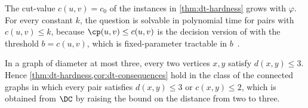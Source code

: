 \begin{remark}
\label{rem:dt-bounded-cut-value}
The cut-value $c(u, v) = c_0$ of the instances in \cref{thm:dt-hardness} grows with $\varphi$.
For every constant $k$, the question is solvable in polynomial time for pairs with $c(u, v) \leq k$, because $\cp(u, v) \leq c(u, v)$ is the decision version of \MinCutPath{} with the threshold $b = c(u, v)$, which is fixed-parameter tractable in $b$~\cite[Theorem~8.4]{Michel2026MinCutPath}.
\end{remark}

\begin{remark}
\label{rem:dt-shifted-class}
In a graph of diameter at most three, every two vertices $x, y$ satisfy $d(x, y) \leq 3$.
Hence \cref{thm:dt-hardness,cor:dt-consequences} hold in the class of the connected graphs in which every pair satisfies $d(x, y) \leq 3$ or $c(x, y) \leq 2$, which is obtained from $\DC$ by raising the bound on the distance from two to three.
\end{remark}
